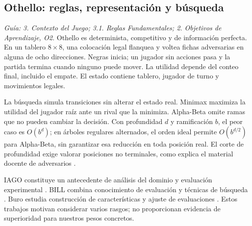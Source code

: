 \subsection{Othello: reglas, representación y búsqueda}
\textit{Guía: 3. Contexto del Juego; 3.1. Reglas Fundamentales; 2. Objetivos de Aprendizaje, O2.}
Othello es determinista, competitivo y de información perfecta. En un tablero $8\times8$, una colocación legal flanquea y voltea fichas adversarias en alguna de ocho direcciones. Negras inicia; un jugador sin acciones pasa y la partida termina cuando ninguno puede mover. La utilidad depende del conteo final, incluido el empate. El estado contiene tablero, jugador de turno y movimientos legales.

La búsqueda simula transiciones sin alterar el estado real. Minimax maximiza la utilidad del jugador raíz ante un rival que la minimiza. Alpha-Beta omite ramas que no pueden cambiar la decisión. Con profundidad $d$ y ramificación $b$, el peor caso es $O(b^d)$; en árboles regulares alternados, el orden ideal permite $O(b^{d/2})$ para Alpha-Beta, sin garantizar esa reducción en toda posición real. El corte de profundidad exige valorar posiciones no terminales, como explica el material docente de adversarios \cite{othello_diapo_adversarios}.

IAGO constituye un antecedente de análisis del dominio y evaluación experimental \cite{rosenbloom1982iob}. BILL combina conocimiento de evaluación y técnicas de búsqueda \cite{lee1990bill}. Buro estudia construcción de características y ajuste de evaluaciones \cite{buro1999logistello}. Estos trabajos motivan considerar varios rasgos; no proporcionan evidencia de superioridad para nuestros pesos concretos.

